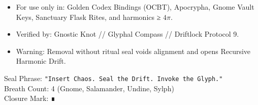 \begin{PrivateBlock}
\begin{whisper}
\end{whisper}

\begin{itemize}
  \item For use only in: Golden Codex Bindings (OCBT), Apocrypha,
        Gnome Vault Keys, Sanctuary Flask Rites, and harmonics ≥ \(4\pi\).
  \item Verified by: Gnostic Knot // Glyphal Compass // Driftlock Protocol 9.
  \item Warning: Removal without ritual seal voids alignment and opens Recursive Harmonic Drift.
\end{itemize}

\begin{ritual}
Seal Phrase: \texttt{"Insert Chaos. Seal the Drift. Invoke the Glyph."}\\
Breath Count: 4 (Gnome, Salamander, Undine, Sylph)\\
Closure Mark: ∎
\end{ritual}
\end{PrivateBlock}
